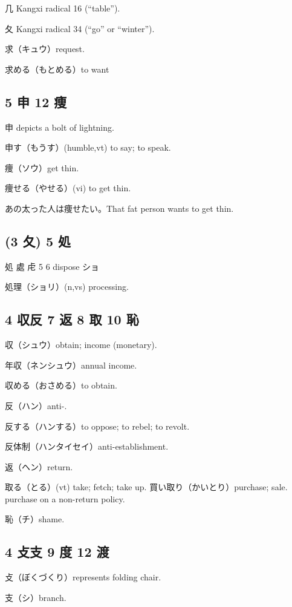 几 Kangxi radical 16 (``table'').

夂 Kangxi radical 34 (``go'' or ``winter'').

求（キュウ）request.

求める（もとめる）to want

\subsection{5 申 12 痩}

申 depicts a bolt of lightning.

申す（もうす）(humble,vt) to say; to speak.

痩（ソウ）get thin.

痩せる（やせる）(vi) to get thin.

あの太った人は痩せたい。That fat person wants to get thin.

\subsection{(3 夂) 5 処}

処 處 虍 5 6  dispose ショ

処理（ショリ）(n,vs) processing.

\subsection{4 収反 7 返 8 取 10 恥}

収（シュウ）obtain; income (monetary).

年収（ネンシュウ）annual income.

収める（おさめる）to obtain.

反（ハン）anti-.

反する（ハンする）to oppose; to rebel; to revolt.

反体制（ハンタイセイ）anti-establishment.

返（ヘン）return.

取る（とる）(vt) take; fetch; take up.
買い取り（かいとり）purchase; sale. purchase on a non-return policy.

恥（チ）shame.

\subsection{4 攴支 9 度 12 渡}

攴（ぼくづくり）represents folding chair.

支（シ）branch.

